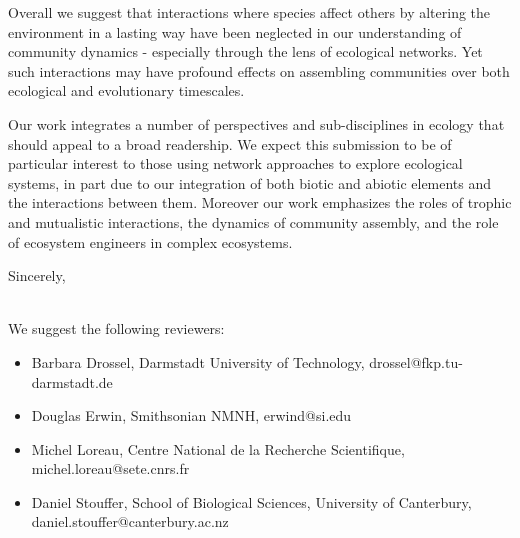 \documentclass[ucm,12pt]{ucletter}
\begin{document}
\begin{letter}
Overall we suggest that interactions where species affect others by altering the environment in a lasting way have been neglected in our understanding of community dynamics - especially through the lens of ecological networks. Yet such interactions may have profound effects on assembling communities over both ecological and evolutionary timescales.

Our work integrates a number of perspectives and sub-disciplines in ecology that should appeal to a broad readership. We expect this submission to be of particular interest to those using network approaches to explore ecological systems, in part due to our integration of both biotic and abiotic elements and the interactions between them. Moreover our work emphasizes the roles of trophic and mutualistic interactions, the dynamics of community assembly, and the role of ecosystem engineers in complex ecosystems.


\vspace{0mm}

\singlespacing
\closing{Sincerely,\\
\\
}

We suggest the following reviewers:
\begin{itemize}
\item Barbara Drossel, Darmstadt University of Technology, drossel@fkp.tu-darmstadt.de
\item Douglas Erwin, Smithsonian NMNH, erwind@si.edu
\item Michel Loreau, Centre National de la Recherche Scientifique, michel.loreau@sete.cnrs.fr
\item Daniel Stouffer, School of Biological Sciences, University of Canterbury, daniel.stouffer@canterbury.ac.nz
\end{itemize}


\end{letter}
\end{document}
